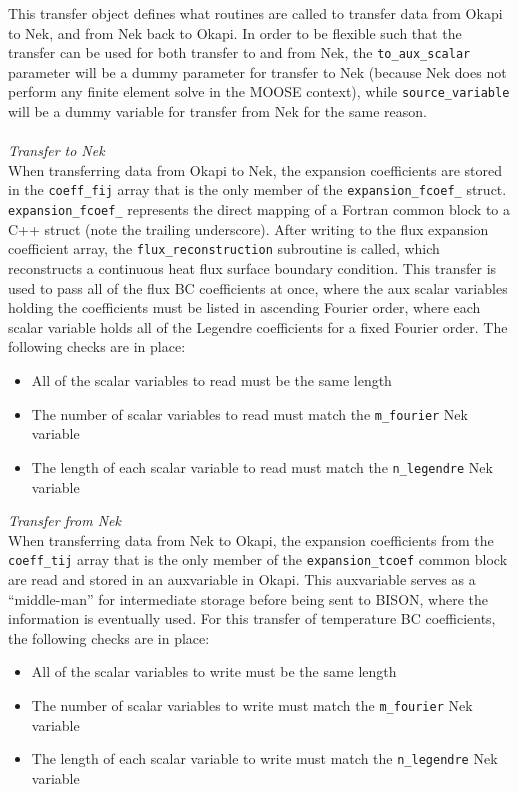 \documentclass[10pt]{article}
\newcounter{subsubsubsection}[subsubsection]
\numberwithin{equation}{section} %
\begin{document}
This transfer object defines what routines are called to transfer data from Okapi to Nek, and from Nek back to Okapi. In order to be flexible such that the transfer can be used for both transfer to and from Nek, the {\tt to\_aux\_scalar} parameter will be a dummy parameter for transfer to Nek (because Nek does not perform any finite element solve in the MOOSE context), while {\tt source\_variable} will be a dummy variable for transfer from Nek for the same reason.
\\\\
{\it Transfer to Nek}\\
When transferring data from Okapi to Nek, the expansion coefficients are stored in the {\tt coeff\_fij} array that is the only member of the {\tt expansion\_fcoef\_} struct. {\tt expansion\_fcoef\_} represents the direct mapping of a Fortran common block to a C++ struct (note the trailing underscore). After writing to the flux expansion coefficient array, the {\tt flux\_reconstruction} subroutine is called, which reconstructs a continuous heat flux surface boundary condition. This transfer is used to pass all of the flux BC coefficients at once, where the aux scalar variables holding the coefficients must be listed in ascending Fourier order, where each scalar variable holds all of the Legendre coefficients for a fixed Fourier order. The following checks are in place:

\begin{itemize}
\item All of the scalar variables to read must be the same length
\item The number of scalar variables to read must match the {\tt m\_fourier} Nek variable
\item The length of each scalar variable to read must match the {\tt n\_legendre} Nek variable
\end{itemize}

{\it Transfer from Nek}\\
When transferring data from Nek to Okapi, the expansion coefficients from the {\tt coeff\_tij} array that is the only member of the {\tt expansion\_tcoef} common block are read and stored in an auxvariable in Okapi. This auxvariable serves as a ``middle-man'' for intermediate storage before being sent to BISON, where the information is eventually used. For this transfer of temperature BC coefficients, the following checks are in place:

\begin{itemize}
\item All of the scalar variables to write must be the same length
\item The number of scalar variables to write must match the {\tt m\_fourier} Nek variable
\item The length of each scalar variable to write must match the {\tt n\_legendre} Nek variable
\end{itemize} 
\end{document}

